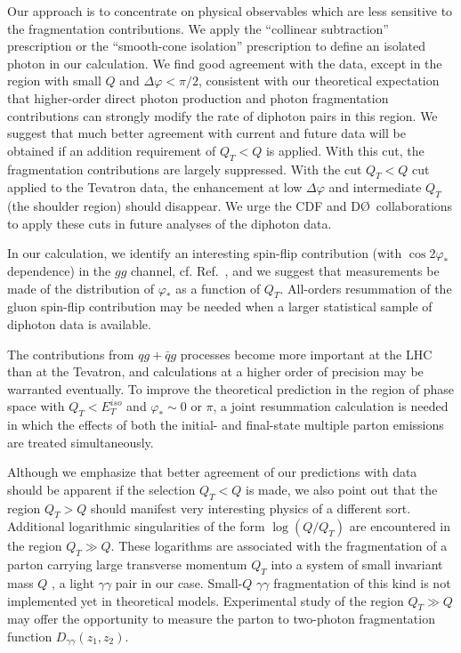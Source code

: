 \documentclass[12pt,english,aps,preprint,prd,letterpaper,fleqn,nofootinbib,showpacs,showkeys,tightenlines,floatfix]{revtex4}
\begin{document}
{Our approach is to concentrate on physical observables which are less
sensitive to the fragmentation contributions. We apply the {}``collinear
subtraction'' prescription or the {}``smooth-cone isolation'' prescription
to define an isolated photon in our calculation.  We find good agreement 
with the data, except in the region with small $Q$ and $\Delta\varphi<\pi/2$, 
consistent with our theoretical expectation that higher-order direct photon 
production
and photon fragmentation contributions can strongly modify the rate of 
diphoton pairs in this region.  We 
suggest that much better agreement with current and future data will be 
obtained if an addition requirement of $Q_{T}<Q$ is applied. With this cut, 
the fragmentation contributions are largely suppressed.  With the cut 
$Q_{T}<Q$ cut applied to the Tevatron data, the enhancement at low 
$\Delta\varphi$ and intermediate $Q_{T}$ (the shoulder region) should 
disappear. We urge the CDF and D\O\, collaborations to apply these cuts in
future analyses of the diphoton data.  

In our calculation, we identify an interesting spin-flip
contribution (with $\cos2\varphi_{*}$ dependence) in the $gg$
channel, cf. Ref.~\cite{Nadolsky:2007ba}, and we suggest that measurements be 
made of the 
distribution of $\varphi_{*}$ as a function of $Q_{T}$. All-orders resummation 
of the gluon spin-flip contribution may be needed when a 
larger statistical sample of diphoton data is available.  

The contributions from $qg+{\bar{q}}g$ processes become more important at 
the LHC than at the Tevatron, and calculations at a higher order of precision 
may be warranted eventually. To improve the theoretical
prediction in the region of phase space with $Q_{T}<E_{T}^{iso}$
and $\varphi_{*}\sim0$ or $\pi$, a joint resummation calculation
is needed in which the effects of both the initial- and final-state multiple 
parton emissions are treated simultaneously.  

Although we emphasize that better agreement of our predictions with
data should be apparent if the selection $Q_{T}<Q$ is made, we also point 
out that the region $Q_{T} > Q$ should manifest very interesting physics of 
a different sort. Additional logarithmic singularities of the form 
$\log(Q/Q_{T})$ are encountered in the region $Q_{T} \gg Q$.  These
logarithms are associated with the fragmentation of a parton carrying
large transverse momentum $Q_{T}$ into a system of small invariant
mass $Q$ \cite{Berger:1998ev,Berger:2001wr}, a light $\gamma\gamma$
pair in our case.  Small-$Q$ $\gamma\gamma$ fragmentation of this
kind is not implemented yet in theoretical models. 
Experimental study of the region $Q_{T} \gg Q$ may offer the
opportunity to measure the parton to two-photon fragmentation function
$D_{\gamma\gamma}(z_{1},z_{2})$. 

}
\end{document}
